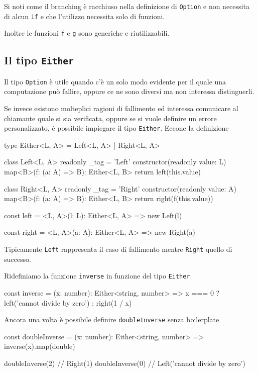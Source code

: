 \documentclass[12pt]{article}
\theoremstyle{definition}
\newenvironment{code}
  {\vspace{0.5cm} \VerbatimEnvironment\begin{typescriptcode}}
  {\end{typescriptcode} \vspace{0.2cm}}
\begin{document}
Si noti come il branching è racchiuso nella definizione di \texttt{Option} e non necessita di alcun \texttt{if}
e che l'utilizzo necessita solo di funzioni.

Inoltre le funzioni \texttt{f} e \texttt{g} sono generiche e riutilizzabili.

\subsection{Il tipo \texttt{Either}}

Il tipo \texttt{Option} è utile quando c'è un solo modo evidente per il quale una computazione può fallire,
oppure ce ne sono diversi ma non interessa distinguerli.

Se invece esistono molteplici ragioni di fallimento ed interessa comunicare al chiamante quale si sia verificata,
oppure se si vuole definire un errore personalizzato, è possibile impiegare il tipo \texttt{Either}. Eccone la definizione

\begin{code}
type Either<L, A> = Left<L, A> | Right<L, A>

class Left<L, A> {
  readonly _tag = 'Left'
  constructor(readonly value: L) {}
  map<B>(f: (a: A) => B): Either<L, B> {
    return left(this.value)
  }
}

class Right<L, A> {
  readonly _tag = 'Right'
  constructor(readonly value: A) {}
  map<B>(f: (a: A) => B): Either<L, B> {
    return right(f(this.value))
  }
}

const left = <L, A>(l: L): Either<L, A> =>
  new Left(l)

const right = <L, A>(a: A): Either<L, A> =>
  new Right(a)
\end{code}

Tipicamente \texttt{Left} rappresenta il caso di fallimento mentre \texttt{Right} quello di successo.

Ridefiniamo la funzione \texttt{inverse} in funzione del tipo \texttt{Either}

\begin{code}
const inverse = (x: number): Either<string, number> =>
  x === 0 ? left('cannot divide by zero') : right(1 / x)
\end{code}

Ancora una volta è possibile definire \texttt{doubleInverse} senza boilerplate

\begin{code}
const doubleInverse = (x: number): Either<string, number> =>
  inverse(x).map(double)

doubleInverse(2) // Right(1)
doubleInverse(0) // Left('cannot divide by zero')
\end{code}
\end{document}
